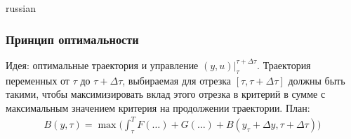 \documentclass{article}
\begin{document}
\begin{otherlanguage*}{russian}
\subsubsection*{Принцип оптимальности}
Идея: оптимальные траектория и управление $ (y, u)|_{\tau}^{\tau + \Delta \tau} $. Траектория переменных от $ \tau $ до $ \tau + \Delta \tau $, выбираемая для отрезка $ [\tau , \tau + \Delta \tau ]$ должны быть такими, чтобы максимизировать вклад этого отрезка в критерий в сумме с максимальным значением критерия на продолжении траектории. 
План: 
\begin{align*}
B(y, \tau) = \max \Big( \int_\tau^T F(\ldots) + G(\ldots) + B(y_\tau + \Delta y , \tau + \Delta \tau )\Big)
\end{align*}
\end{otherlanguage*}
\end{document}
